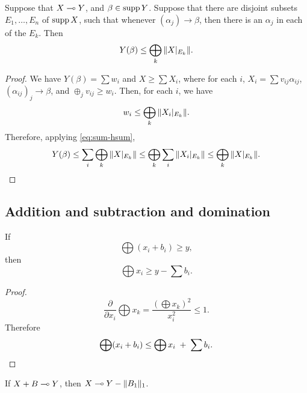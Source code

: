 \begin{lemma} \label{lem:in-each}
Suppose that $X \multimap Y$,
and $\beta \in \operatorname{supp} Y$.
Suppose that there are disjoint subsets $E_1, \ldots, E_n$ of $\operatorname{supp} X$,
such that whenever $(\alpha_j) \to \beta$, 
then there is an $\alpha_j$ in each of the $E_k$.
Then 
$$
Y(\beta) \le \bigoplus_k \Vert X|_{E_k} \Vert.
$$
\end{lemma}
\begin{proof}
We have $Y(\beta) = \sum w_i$ and $X \ge \sum X_i$,  
where for each $i$, 
$X_i =  \sum v_{ij} \alpha_{ij}$,
$(\alpha_{ij})_j \to \beta$, and $\oplus_j v_{ij} \ge w_i$. 
Then,
for each $i$,
we have
$$
w_i \le \bigoplus_k \Vert X_i|_{E_k} \Vert.
$$
Therefore, applying \eqref{eq:sum-hsum},
$$
Y(\beta) \le \sum_i \bigoplus_k \Vert X|_{E_k} \Vert \le \bigoplus_k \sum_i \Vert X_i|_{E_k} \Vert \le \bigoplus_k \Vert X|_{E_k} \Vert. 
\qedhere
$$
\end{proof}

\subsection{Addition and subtraction and domination}
\begin{lem} \label{minus b}
If
$$\bigoplus ( x_i + b_i ) \ge y,$$
then
$$\bigoplus x_i \ge y - \sum b_i.$$
\end{lem}

\begin{proof}
$$
  \frac {\partial}{\partial x_i}\bigoplus x_k = \frac{(\bigoplus x_k)^2}{x_i^2} \le 1.
$$
Therefore
$$
\bigoplus (x_i + b_i) \le \bigoplus x_i \; + \; \sum b_i. \qedhere
$$
\end{proof}

\begin{lem} \label{lem:subtract-from-right}
If $X + B \multimap Y$,
then $X \multimap Y - \Vert B_1 \Vert_1$.
\end{lem}

